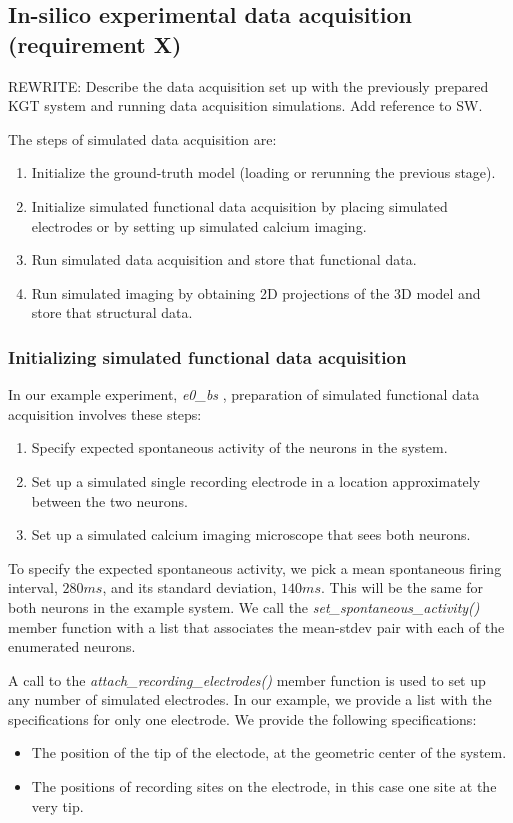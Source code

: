 \documentclass{ldr-article}
\def\firstexp{\textit{e0\_bs} }
\begin{document}
\subsection{In-silico experimental data acquisition (requirement X)}

\alert{REWRITE:} Describe the data acquisition set up with the previously prepared KGT system and running data acquisition simulations. Add reference to SW.

The steps of simulated data acquisition are:
\begin{enumerate}
	\item Initialize the ground-truth model (loading or rerunning the previous stage).
	\item Initialize simulated functional data acquisition by placing simulated electrodes or by setting up simulated calcium imaging.
	\item Run simulated data acquisition and store that functional data.
	\item Run simulated imaging by obtaining 2D projections of the 3D model and store that structural data.
\end{enumerate}

\subsubsection{Initializing simulated functional data acquisition}

In our example experiment, \firstexp, preparation of simulated functional data acquisition involves these steps:
\begin{enumerate}
	\item Specify expected spontaneous activity of the neurons in the system.
	\item Set up a simulated single recording electrode in a location approximately between the two neurons.
	\item Set up a simulated calcium imaging microscope that sees both neurons.
\end{enumerate}

To specify the expected spontaneous activity, we pick a mean spontaneous firing interval, $280 ms$, and its standard deviation, $140 ms$. This will be the same for both neurons in the example system. We call the \textit{set\_spontaneous\_activity()} member function with a list that associates the mean-stdev pair with each of the enumerated neurons.

A call to the \textit{attach\_recording\_electrodes()} member function is used to set up any number of simulated electrodes. In our example, we provide a list with the specifications for only one electrode. We provide the following specifications:
\begin{itemize}
	\item The position of the tip of the electode, at the geometric center of the system.
	\item The positions of recording sites on the electrode, in this case one site at the very tip.
\end{itemize}
\end{document}
